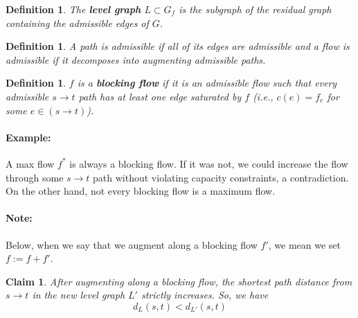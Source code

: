\documentclass[11pt]{article}
\newtheorem{definition}[theorem]{Definition}
\newtheorem{claim}[theorem]{Claim}
\begin{document}
\begin{definition}
The \textbf{level graph} $L \subset G_f$ is the subgraph of the residual graph containing the admissible edges of $G$. 
\end{definition}

\begin{definition}
A path is admissible if all of its edges are admissible and a flow is admissible if it decomposes into augmenting admissible paths. 
\end{definition}

\begin{definition}
$f$ is a \textbf{blocking flow} if it is an admissible flow such that every admissible $s \to t$ path has at least one edge saturated by $f$ (i.e., $c(e) = f_e$ for some $e \in (s \to t)$). 
\end{definition}

\paragraph{Example:} A max flow $f^*$ is always a blocking flow. If it was not, we could increase the flow through some $s\to t$ path without violating capacity constraints, a contradiction. On the other hand, not every blocking flow is a maximum flow. 

\paragraph{Note:} Below, when we say that we augment along a blocking flow $f'$, we mean we set $f:= f + f'$. 

\begin{claim}
After augmenting along a blocking flow, the shortest path distance from $s \to t$ in the new level graph $L'$ strictly increases. So, we have 
$$
d_L(s, t) < d_{L'}(s, t)
$$
\end{claim}
\end{document}
